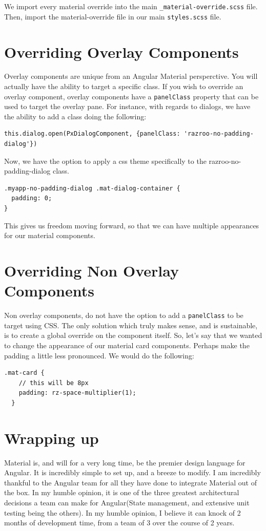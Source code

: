 

We import every material override into the main 
\lstinline{_material-override.scss} file. Then, import the material-override 
file in our main \lstinline{styles.scss} file. 

\section{Overriding Overlay Components}
Overlay components are unique from an Angular Material persperctive. You will
actually have the ability to target a specific class. If you wish to override 
an overlay component, overlay components have a \lstinline{panelClass} property
that can be used to target the overlay pane. For instance, with regards to 
dialogs, we have the ability to add a class doing the following: 
\begin{lstlisting}
this.dialog.open(PxDialogComponent, {panelClass: 'razroo-no-padding-dialog'}) 
\end{lstlisting}

Now, we have the option to apply a css theme specifically to the 
razroo-no-padding-dialog class. 

\begin{lstlisting}
.myapp-no-padding-dialog .mat-dialog-container {
  padding: 0;
}
\end{lstlisting}

This gives us freedom moving forward, so that we can have multiple appearances
for our material components.

\section{Overriding Non Overlay Components}
Non overlay components, do not have the option to add a \lstinline{panelClass}
to be target using CSS. The only solution which truly makes sense, and is 
sustainable, is to create a global override on the component itself. So, let's 
say that we wanted to change the appearance of our material card components. 
Perhaps make the padding a little less pronounced. We would do the following: 
\begin{lstlisting}[caption=\_mat-card.scss override]
  .mat-card {
    // this will be 8px
    padding: rz-space-multiplier(1);
  }
\end{lstlisting}

\section{Wrapping up}
Material is, and will for a very long time, be the premier design language for
Angular. It is incredibly simple to set up, and a breeze to modify. I am 
incredibly thankful to the Angular team for all they have done to integrate 
Material out of the box. In my humble opinion, it is one of the three greatest 
architectural decisions a team can make for Angular(State management, and extensive
unit testing being the others). In my humble opinion, I believe it can knock of 2 
months of development time, from a team of 3 over the course of 2 years. 
